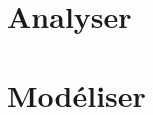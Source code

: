 \documentclass[10pt,fleqn]{book} %
\newcommand{\repStyle}{../../Style}
\begin{document}
\def\xxcompetences{}
\def\xxfigures{}

\graphicspath{{\repStyle/png/}}



\setlength{\columnseprule}{.1pt}

\chapter{Analyser}


\pagestyle{fancy}
\thispagestyle{plain}


\chapter{Modéliser}


\pagestyle{fancy}
\thispagestyle{plain}


\stopcontents

%
%

\stopcontents

\newpage
\printindex
\end{document}
